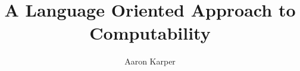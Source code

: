 \documentclass{article}
\author{Aaron Karper}
\title{A Language Oriented Approach to Computability}
\begin{document}
\maketitle
\tableofcontents
\begin{abstract}
  	
\end{abstract}









{}

\end{document}
